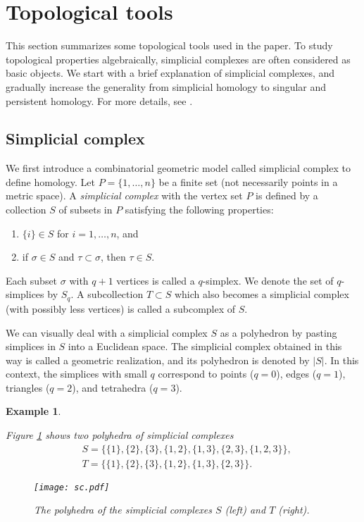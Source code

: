 \documentclass{article}
\newtheorem{exam}[thm]{Example}
\begin{document}
\newpage

\appendix

\section{Topological tools}
\label{sec:topology}
This section summarizes some topological tools used in the paper.
To study topological properties algebraically, simplicial complexes are often considered as basic objects.
We start with a brief explanation of simplicial complexes, and gradually increase the generality from simplicial homology to singular and persistent homology.
For more details, see \cite{Ha02}.

\subsection{Simplicial complex}\label{sec:sc}
We first introduce a combinatorial geometric model called simplicial complex to define homology.
Let $P=\{1,\dots,n\}$ be a finite set (not necessarily points in a metric space).
A {\em simplicial complex} with the vertex set $P$ is defined by a collection $S$ of subsets in $P$ satisfying the following properties:
\begin{enumerate}
\item $\{i\}\in S$ for $i=1,\dots,n$, and
\item if $\sigma\in S$ and $\tau\subset \sigma$, then $\tau\in S$.
\end{enumerate}

Each subset $\sigma$ with $q+1$ vertices is called a $q$-simplex.
We denote the set of $q$-simplices by $S_q$.
A subcollection $T\subset S$ which also becomes a simplicial complex (with possibly less vertices) is called a subcomplex of $S$.

We can visually deal with a simplicial complex $S$ as a polyhedron by pasting simplices in $S$ into a Euclidean space.
The simplicial complex obtained in this way is called a geometric realization, and its polyhedron is denoted by $|S|$. 
In this context, the simplices with small $q$ correspond to points ($q=0$), edges ($q=1$), triangles ($q=2$), and tetrahedra ($q=3$). 
\begin{exam}\label{exam:sc}
{\rm 
Figure \ref{fig:sc} shows two polyhedra of simplicial complexes
\begin{align*}
&S=\{
\{1\},
\{2\},
\{3\},
\{1,2\},
\{1,3\},
\{2,3\},
\{1,2,3\}\},\\
&T=\{
\{1\},
\{2\},
\{3\},
\{1,2\},
\{1,3\},
\{2,3\}\}.
\end{align*}

\begin{figure}[htbp]
\begin{center}
\texttt{[image: sc.pdf]}
\end{center}
\caption{The polyhedra of the simplicial complexes $S$ (left) and $T$ (right).}
\label{fig:sc}
\end{figure}
}\end{exam}
\end{document}
